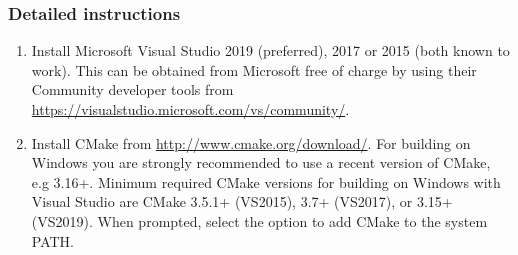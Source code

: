 \subsubsection{Detailed instructions}

\begin{enumerate}
  \item Install Microsoft Visual Studio 2019 (preferred), 2017 or 2015 (both
  known to work). This can be obtained from Microsoft free of charge by using
  their Community developer tools from
  \url{https://visualstudio.microsoft.com/vs/community/}.

  \item Install CMake from \url{http://www.cmake.org/download/}. For building
  on Windows you are strongly recommended to use a recent version of CMake,
  e.g 3.16+. Minimum required CMake versions for building \nekpp on Windows
  with Visual Studio are CMake 3.5.1+ (VS2015), 3.7+ (VS2017), or 3.15+
  (VS2019). When prompted, select the option to add CMake to the system PATH.


\end{enumerate}
